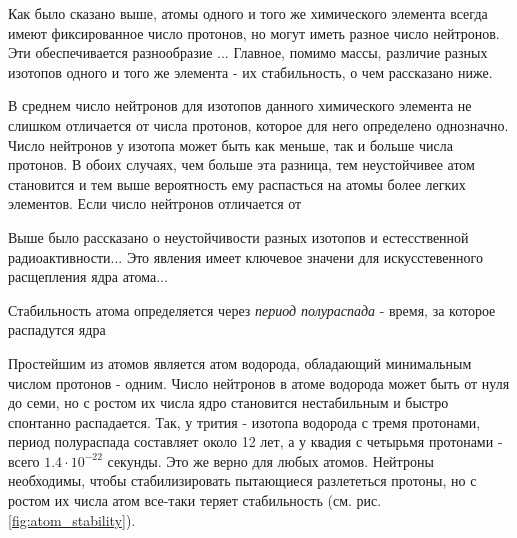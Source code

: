Как было сказано выше, атомы одного и того же химического элемента всегда имеют фиксированное число протонов, но могут иметь разное число нейтронов. 
Эти обеспечивается разнообразие ...
Главное, помимо массы, различие разных изотопов одного и того же элемента - их стабильность, о чем рассказано ниже.



В среднем число нейтронов для изотопов данного химического элемента не слишком отличается от числа протонов, которое для него определено однозначно.
Число нейтронов у изотопа может быть как меньше, так и больше числа протонов.
В обоих случаях, чем больше эта разница, тем неустойчивее атом становится и тем выше вероятность ему распасться на атомы более легких элементов.
Если число нейтронов отличается от 

Выше было рассказано о неустойчивости разных изотопов и естесственной радиоактивности...
Это явления имеет ключевое значени для искусстевенного расщепления ядра атома...


Стабильность атома определяется через \textit{период полураспада} - время, за которое распадутся ядра 




Простейшим из атомов является атом водорода, обладающий минимальным числом протонов - одним.
Число нейтронов в атоме водорода может быть от нуля до семи, но с ростом их числа ядро становится нестабильным и быстро спонтанно распадается.
Так, у трития - изотопа водорода с тремя протонами, период полураспада составляет около 12 лет, а у квадия с четырьмя протонами - всего $1.4\cdot 10^{−22}$ секунды.
Это же верно для любых атомов.
Нейтроны необходимы, чтобы стабилизировать пытающиеся разлететься протоны, но с ростом их числа атом все-таки теряет стабильность (см. рис. \ref{fig:atom_stability}).


